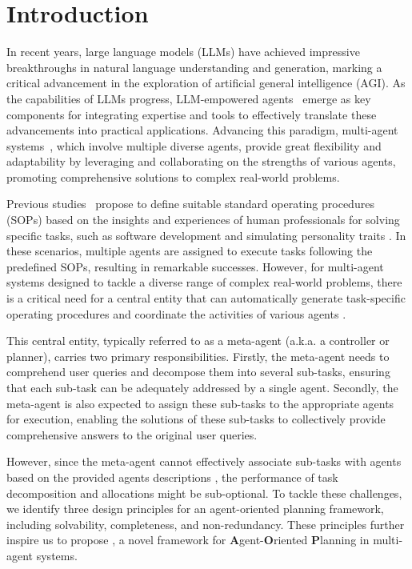 \section{Introduction}

In recent years, large language models (LLMs) \citep{achiam2023gpt, chowdhery2023palm, touvron2023llama} have achieved impressive breakthroughs in natural language understanding and generation, marking a critical advancement in the exploration of artificial general intelligence (AGI). 
As the capabilities of LLMs progress, LLM-empowered agents~\citep{qin2023toolllm, dong2024self, wang2024survey} emerge as key components for integrating expertise and tools to effectively translate these advancements into practical applications.
Advancing this paradigm, multi-agent systems~\citep{shen2024hugginggpt, agentscope, wu2023autogen}, which involve multiple diverse agents, provide great flexibility and adaptability by leveraging and collaborating on the strengths of various agents, promoting comprehensive solutions to complex real-world problems.

Previous studies~\citep{cai2023low, qian2023communicative} propose to define suitable standard operating procedures (SOPs) based on the insights and experiences of human professionals for solving specific tasks, such as software development \citep{hong2023metagpt} and simulating personality traits \citep{serapio2023personality}. In these scenarios, multiple agents are assigned to execute tasks following the predefined SOPs, resulting in remarkable successes. However, for multi-agent systems designed to tackle a diverse range of complex real-world problems, there is a critical need for a central entity that can automatically generate task-specific operating procedures and coordinate the activities of various agents \citep{wang2024survey}.

This central entity, typically referred to as a meta-agent (a.k.a. a controller or planner), carries two primary responsibilities. Firstly, the meta-agent needs to comprehend user queries and decompose them into several sub-tasks, ensuring that each sub-task can be adequately addressed by a single agent. Secondly, the meta-agent is also expected to assign these sub-tasks to the appropriate agents for execution, enabling the solutions of these sub-tasks to collectively provide comprehensive answers to the original user queries.


However, since the meta-agent cannot effectively associate sub-tasks with agents based on the provided agents descriptions \citep{liu2024dynamic, hong2023metagpt}, the performance of task decomposition and allocations might be sub-optional. To tackle these challenges, we identify three design principles for an agent-oriented planning framework, including solvability, completeness, and non-redundancy. These principles further inspire us to propose {\bf \name}, a novel framework for {\bf A}gent-{\bf O}riented {\bf P}lanning in multi-agent systems.


